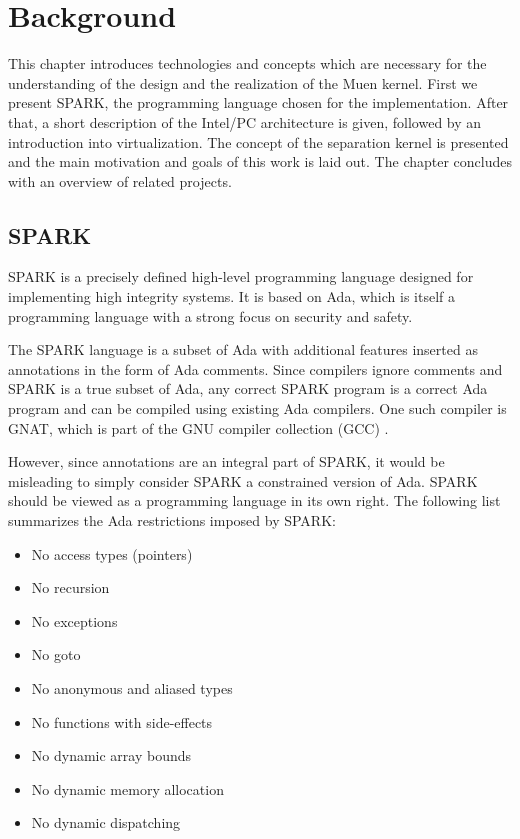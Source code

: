\chapter{Background}
This chapter introduces technologies and concepts which are necessary for the
understanding of the design and the realization of the Muen kernel.  First we
present SPARK, the programming language chosen for the implementation.  After
that, a short description of the Intel/PC architecture is given, followed by an
introduction into virtualization. The concept of the separation kernel is
presented and the main motivation and goals of this work is laid out. The
chapter concludes with an overview of related projects.

\section{SPARK}\label{sec:spark}
SPARK is a precisely defined high-level programming language
designed for implementing high integrity systems. It is based on
Ada, which is itself a programming language with a strong focus on
security and safety.

The SPARK language is a subset of Ada with additional features inserted as
annotations in the form of Ada comments. Since compilers ignore comments and
SPARK is a true subset of Ada, any correct SPARK program is a correct Ada
program and can be compiled using existing Ada compilers. One such compiler is
GNAT, which is part of the GNU compiler collection (GCC) \cite{gcc}.

However, since annotations are an integral part of SPARK, it would be
misleading to simply consider SPARK a constrained version of Ada. SPARK should
be viewed as a programming language in its own right. The following list
summarizes the Ada restrictions imposed by SPARK:

\begin{itemize}
	\item No access types (pointers)
	\item No recursion
	\item No exceptions
	\item No goto
	\item No anonymous and aliased types
	\item No functions with side-effects
	\item No dynamic array bounds
	\item No dynamic memory allocation
	\item No dynamic dispatching
\end{itemize}

